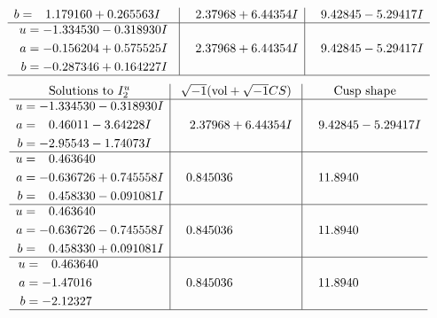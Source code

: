 \documentclass[1p]{elsarticle_modified}
\theoremstyle{definition}
\newcommand{\I}{\sqrt{-1}}
\begin{document}
$$\begin{array}{c|c|c}
\begin{aligned}
b &= \phantom{-}1.179160 + 0.265563 I\end{aligned}
 & \phantom{-}2.37968 + 6.44354 I & \phantom{-}9.42845 - 5.29417 I \\ \hline\begin{aligned}
u &= -1.334530 - 0.318930 I \\
a &= -0.156204 + 0.575525 I \\
b &= -0.287346 + 0.164227 I\end{aligned}
 & \phantom{-}2.37968 + 6.44354 I & \phantom{-}9.42845 - 5.29417 I\\
 \hline 
 \end{array}$$\newpage$$\begin{array}{c|c|c}  
\text{Solutions to }I^u_{2}& \I (\text{vol} + \sqrt{-1}CS) & \text{Cusp shape}\\
 \hline 
\begin{aligned}
u &= -1.334530 - 0.318930 I \\
a &= \phantom{-}0.46011 - 3.64228 I \\
b &= -2.95543 - 1.74073 I\end{aligned}
 & \phantom{-}2.37968 + 6.44354 I & \phantom{-}9.42845 - 5.29417 I \\ \hline\begin{aligned}
u &= \phantom{-}0.463640\phantom{ +0.000000I} \\
a &= -0.636726 + 0.745558 I \\
b &= \phantom{-}0.458330 - 0.091081 I\end{aligned}
 & \phantom{-}0.845036\phantom{ +0.000000I} & \phantom{-}11.8940\phantom{ +0.000000I} \\ \hline\begin{aligned}
u &= \phantom{-}0.463640\phantom{ +0.000000I} \\
a &= -0.636726 - 0.745558 I \\
b &= \phantom{-}0.458330 + 0.091081 I\end{aligned}
 & \phantom{-}0.845036\phantom{ +0.000000I} & \phantom{-}11.8940\phantom{ +0.000000I} \\ \hline\begin{aligned}
u &= \phantom{-}0.463640\phantom{ +0.000000I} \\
a &= -1.47016\phantom{ +0.000000I} \\
b &= -2.12327\phantom{ +0.000000I}\end{aligned}
 & \phantom{-}0.845036\phantom{ +0.000000I} & \phantom{-}11.8940\phantom{ +0.000000I}\\
 \hline 
 \end{array}$$\newpage\newpage\renewcommand{\arraystretch}{1}
\end{document}

